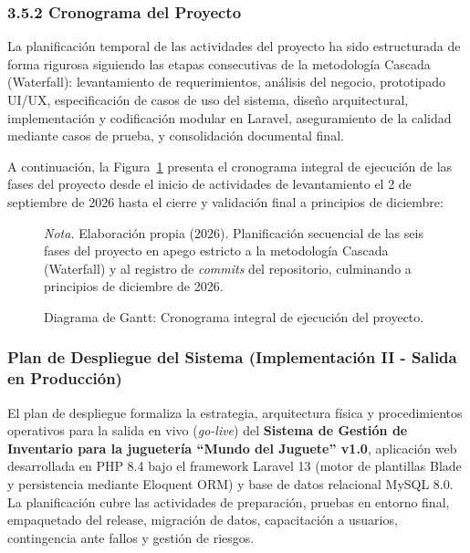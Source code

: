 \documentclass[12pt,a4paper]{article}
\begin{document}
\subsubsection{3.5.2 Cronograma del Proyecto}

La planificación temporal de las actividades del proyecto ha sido estructurada de forma rigurosa siguiendo las etapas consecutivas de la metodología Cascada (Waterfall): levantamiento de requerimientos, análisis del negocio, prototipado UI/UX, especificación de casos de uso del sistema, diseño arquitectural, implementación y codificación modular en Laravel, aseguramiento de la calidad mediante casos de prueba, y consolidación documental final.

A continuación, la Figura~\ref{fig:gantt_cronograma_proyecto} presenta el cronograma integral de ejecución de las fases del proyecto desde el inicio de actividades de levantamiento el 2 de septiembre de 2026 hasta el cierre y validación final a principios de diciembre:

\begin{figure}[H]
  \caption{Diagrama de Gantt: Cronograma integral de ejecuci\'on del proyecto.}
  \label{fig:gantt_cronograma_proyecto}
  \centering
  \resizebox{\textwidth}{!}{}
  \par\vspace{1ex}
  \raggedright\noindent\small \emph{Nota.} Elaboraci\'on propia (2026). Planificaci\'on secuencial de las seis fases del proyecto en apego estricto a la metodolog\'ia Cascada (Waterfall) y al registro de \emph{commits} del repositorio, culminando a principios de diciembre de 2026.
\end{figure}

\subsubsection*{Plan de Despliegue del Sistema (Implementación II - Salida en Producción)}

El plan de despliegue formaliza la estrategia, arquitectura física y procedimientos operativos para la salida en vivo (\emph{go-live}) del \textbf{Sistema de Gestión de Inventario para la juguetería ``Mundo del Juguete'' v1.0}, aplicación web desarrollada en PHP 8.4 bajo el framework Laravel 13 (motor de plantillas Blade y persistencia mediante Eloquent ORM) y base de datos relacional MySQL 8.0. La planificación cubre las actividades de preparación, pruebas en entorno final, empaquetado del release, migración de datos, capacitación a usuarios, contingencia ante fallos y gestión de riesgos.
\end{document}
